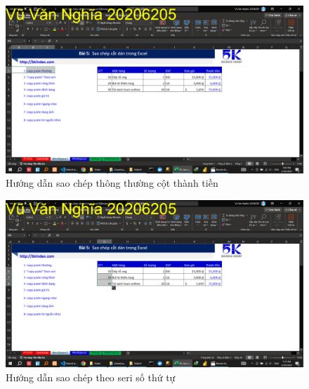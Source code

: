 \documentclass{article}
\begin{document}
\begin{figure}[h]
    \centering
    \includegraphics[scale = 0.15]{Video4/HuongDan/1.png}
    \caption{Hướng dẫn sao chép thông thường cột thành tiền}
\end{figure}
\begin{figure}[h]
    \centering
    \includegraphics[scale = 0.15]{Video4/HuongDan/2.png}
    \caption{Hướng dẫn sao chép theo seri số thứ tự}
\end{figure}












\end{document}
